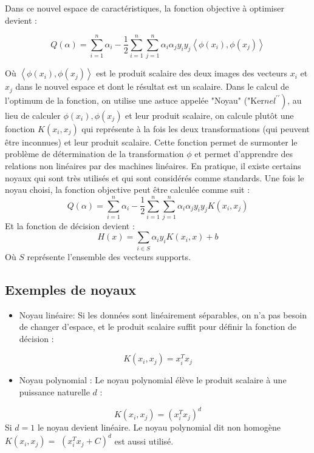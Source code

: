 \documentclass[12pt,a4paper]{report}
\begin{document}
Dans ce nouvel espace de caractéristiques, la fonction objective à optimiser devient :

$$
Q(\alpha)=\sum_{i=1}^{n} \alpha_{i}-\frac{1}{2} \sum_{i=1}^{n} \sum_{j=1}^{n} \alpha_{i} \alpha_{j} y_{i} y_{j}\left\langle\phi\left(x_{i}\right), \phi\left(x_{j}\right)\right\rangle
$$

Où $\left\langle\phi\left(x_{i}\right), \phi\left(x_{j}\right)\right\rangle$ est le produit scalaire des deux images des vecteurs $x_{i}$ et $x_{j}$ dans le nouvel espace et dont le résultat est un scalaire.
Dans le calcul de l'optimum de la fonction, on utilise une astuce appelée "Noyau" ("Ker$\left.n e l^{\prime \prime}\right)$, au lieu de calculer $\phi\left(x_{i}\right), \phi\left(x_{j}\right)$ et leur produit scalaire, on calcule plutôt une fonction $K\left(x_{i}, x_{j}\right)$ qui représente à la fois les deux transformations (qui peuvent être inconnues) et leur produit scalaire. Cette fonction permet de surmonter le problème de détermination de la transformation $\phi$ et permet d'apprendre des relations non linéaires par des machines linéaires. En pratique, il existe certains noyaux qui sont très utilisés et qui sont considérés comme standards. Une fois le noyau choisi, la fonction objective peut être calculée comme suit :
$$
Q(\alpha)=\sum_{i=1}^{n} \alpha_{i}-\frac{1}{2} \sum_{i=1}^{n} \sum_{j=1}^{n} \alpha_{i} \alpha_{j} y_{i} y_{j} K\left(x_{i}, x_{j}\right)
$$
Et la fonction de décision devient :
$$
H(x)=\sum_{i \in S} \alpha_{i} y_{i} K\left(x_{i}, x\right)+b
$$
Où $S$ représente l'ensemble des vecteurs supports.

\subsection{Exemples de noyaux}
\begin{itemize}
	\item Noyau linéaire: Si les données sont linéairement séparables, on n'a pas besoin de changer d'espace, et le produit scalaire suffit pour définir la fonction de décision :
\end{itemize}
$$
K\left(x_{i}, x_{j}\right)=x_{i}^{T} x_{j}
$$
\begin{itemize}
	\item Noyau polynomial : Le noyau polynomial élève le produit scalaire à une puissance naturelle $d$ :
\end{itemize}
$$
K\left(x_{i}, x_{j}\right)=\left(x_{i}^{T} x_{j}\right)^{d}
$$
Si $d=1$ le noyau devient linéaire. Le noyau polynomial dit non homogène $K\left(x_{i}, x_{j}\right)=$ $\left(x_{i}^{T} x_{j}+C\right)^{d}$ est aussi utilisé.
\end{document}
